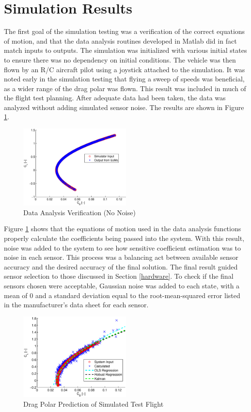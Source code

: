 \section{Simulation Results}
The first goal of the simulation testing was a verification of the correct equations of motion, and that the data analysis routines developed in Matlab did in fact match inputs to outputs. The simulation was initialized with various initial states to ensure there was no dependency on initial conditions. The vehicle was then flown by an R/C aircraft pilot using a joystick attached to the simulation. It was noted early in the simulation testing that flying a sweep of speeds was beneficial, as a wider range of the drag polar was flown. This result was included in much of the flight test planning. After adequate data had been taken, the data was analyzed without adding simulated sensor noise. The results are shown in Figure \ref{dragPolarNoNoise}.

\begin{figure}[h!]
\label{dragPolarNoNoise}
  \caption{Data Analysis Verification (No Noise)} 
  \centering
    \includegraphics[width=0.5\textwidth]{figures/dragPolarNoNoise.eps}
\end{figure}

Figure \ref{dragPolarNoNoise} shows that the equations of motion used in the data analysis functions properly calculate the coefficients being passed into the system. With this result, noise was added to the system to see how sensitive coefficient estimation was to noise in each sensor. This process was a balancing act between available sensor accuracy and the desired accuracy of the final solution. The final result guided sensor selection to those discussed in Section \ref{hardware}. To check if the final sensors chosen were acceptable, Gaussian noise was added to each state, with a mean of $0$ and a standard deviation equal to the root-mean-squared error listed in the manufacturer's data sheet for each sensor.
\begin{figure}[H]
  \caption{Drag Polar Prediction of Simulated Test Flight} \label{dragPolarNoise}
  \centering
    \includegraphics[width=0.5\textwidth]{figures/simDragPolarNoise.eps}
\end{figure}

